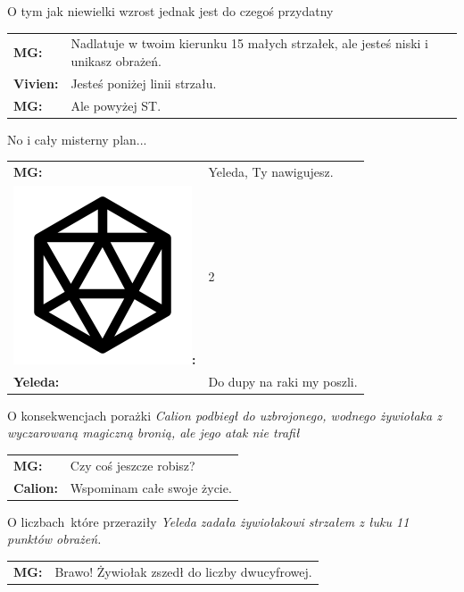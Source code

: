 \documentclass[10pt,twoside,twocolumn]{book}
\begin{document}
\begin{rpg-quotebox}{O tym jak niewielki wzrost jednak jest do czegoś przydatny}
   \begin{tabularx}{\columnwidth}{lX}
      \textbf{MG:} & Nadlatuje w twoim kierunku 15 małych strzałek, ale jesteś niski i unikasz obrażeń.\\
      \textbf{Vivien:} & Jesteś poniżej linii strzału.\\
      \textbf{MG:} & Ale powyżej ST.\\
   \end{tabularx}
\end{rpg-quotebox}

\begin{rpg-quotebox}{No i cały misterny plan...}
   \begin{tabularx}{\columnwidth}{lX}
      \textbf{MG:} & Yeleda, Ty nawigujesz.\\
      \includegraphics[scale=0.06]{img/d20.png}\textbf{:}& 2\\
      \textbf{Yeleda:} & Do dupy na raki my poszli.\\
   \end{tabularx}
\end{rpg-quotebox}

\begin{rpg-quotebox}{O konsekwencjach porażki}
   \textit{Calion podbiegł do uzbrojonego, wodnego żywiołaka z wyczarowaną magiczną bronią, ale jego atak nie trafił}\\
   
   \begin{tabularx}{\columnwidth}{lX}
      \textbf{MG:} & Czy coś jeszcze robisz?\\
      \textbf{Calion:} & Wspominam całe swoje życie.\\
   \end{tabularx}
\end{rpg-quotebox}

\begin{rpg-quotebox}{O liczbach\, które przeraziły}
   \textit{Yeleda zadała żywiołakowi strzałem z łuku 11 punktów obrażeń.}\\

   \begin{tabularx}{\columnwidth}{lX}
      \textbf{MG:} & Brawo! Żywiołak zszedł do liczby dwucyfrowej.\\
   \end{tabularx}
\end{rpg-quotebox}
\end{document}
